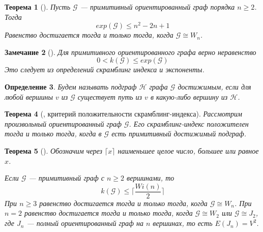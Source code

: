 \documentclass[12pt]{article}
\newtheorem{theorem}{Теорема}[section]
\newtheorem{definition}[theorem]{Определение}
\newtheorem{remark}[theorem]{Замечание}
\begin{document}
\begin{theorem} [\cite{scramblingIndex}]
Пусть $\mathcal{G}$ --- примитивный ориентированный граф порядка $n \ge 2$. Тогда \begin{equation*}
    exp(\mathcal{G}) \le n^2 - 2n + 1
\end{equation*}
Равенство достигается тогда и только тогда, когда $\mathcal{G} \cong W_n$.
\end{theorem}

\begin{remark}[\cite{scramblingIndex}]
Для примитивного ориентированного графа верно неравенство \begin{equation*}
    0 < k(\mathcal{G}) \le exp(\mathcal{G})
\end{equation*}
Это следует из определений скрамблинг индекса и экспоненты.
\end{remark}

\begin{definition}
Будем называть подграф $\mathcal{H}$ графа $\mathcal{G}$ достижимым, если для любой вершины $v$ из $\mathcal{G}$ существует путь из $v$ в какую-либо вершину из $\mathcal{H}$.
\end{definition}

\begin{theorem} [\cite{scramblingIndex}, критерий положительности скрамблинг-индекса]
\label{theorem:ScramblingIndexCriteria}
Рассмотрим произвольный ориентированный граф $\mathcal{G}$. Его скрамблинг-индекс положителен тогда и только тогда, когда в $\mathcal{G}$ есть примитивный достижимый подграф.

\end{theorem}

\begin{theorem} [\cite{scramblingIndex}]
Обозначим через $\lceil x \rceil$ наименьшее целое число, большее или равное $x$.

Если $\mathcal{G}$ --- примитивный граф с $n \ge 2 $ вершинами, то \begin{equation*}
    k(\mathcal{G}) \le \bigg \lceil \frac{Wi(n)}{2} \bigg \rceil
\end{equation*}
При $n \ge 3$ равенство достигается тогда и только тогда, когда $\mathcal{G} \cong W_n$. При $n = 2$ равенство достигается тогда и только тогда, когда $\mathcal{G} \cong W_2$ или $\mathcal{G} \cong J_2$, где $J_n$ --- полный ориентированный граф на $n$ вершинах, то есть $E(J_n) = V^2$.
\end{theorem}
\end{document}
